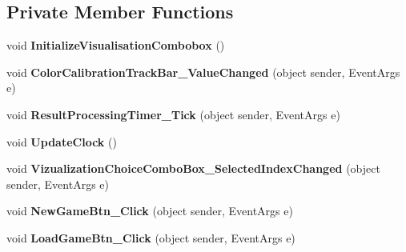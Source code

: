 \subsection*{Private Member Functions}
\begin{DoxyCompactItemize}
\item 
\mbox{\label{class_chess_tracking_1_1_user_interface_1_1_main_game_form_a3d757008876899e5981906ea3c584147}} 
void {\bfseries Initialize\+Visualisation\+Combobox} ()
\item 
\mbox{\label{class_chess_tracking_1_1_user_interface_1_1_main_game_form_a67a69e7993a4609c4bd9065935ccf9b1}} 
void {\bfseries Color\+Calibration\+Track\+Bar\+\_\+\+Value\+Changed} (object sender, Event\+Args e)
\item 
\mbox{\label{class_chess_tracking_1_1_user_interface_1_1_main_game_form_ab8f5fcc0e7101e03c0ecb58e69567830}} 
void {\bfseries Result\+Processing\+Timer\+\_\+\+Tick} (object sender, Event\+Args e)
\item 
\mbox{\label{class_chess_tracking_1_1_user_interface_1_1_main_game_form_ae6f7d075784437aa6e9879c71c04e4b9}} 
void {\bfseries Update\+Clock} ()
\item 
\mbox{\label{class_chess_tracking_1_1_user_interface_1_1_main_game_form_a95cc65a1367c18225c259785778ab3bd}} 
void {\bfseries Vizualization\+Choice\+Combo\+Box\+\_\+\+Selected\+Index\+Changed} (object sender, Event\+Args e)
\item 
\mbox{\label{class_chess_tracking_1_1_user_interface_1_1_main_game_form_a57e165b86a452bb7bca9e6591c26507d}} 
void {\bfseries New\+Game\+Btn\+\_\+\+Click} (object sender, Event\+Args e)
\item 
\mbox{\label{class_chess_tracking_1_1_user_interface_1_1_main_game_form_afa05513562f6bef99044f93a197f5abc}} 
void {\bfseries Load\+Game\+Btn\+\_\+\+Click} (object sender, Event\+Args e)

\end{DoxyCompactItemize}
